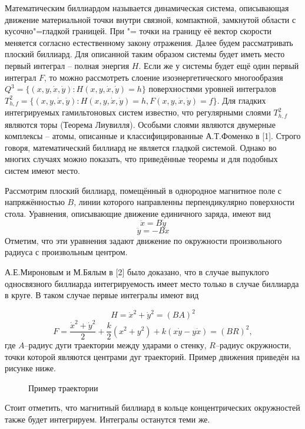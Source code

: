 \vzmscaption

	Математическим биллиардом называется динамическая система, описывающая движение материальной точки внутри связной, компактной, замкнутой области с кусочно"=гладкой границей. При "= точки на границу её вектор скорости меняется согласно естественному закону отражения. Далее будем рассматривать плоский биллиард. Для описанной таким образом системы будет иметь место первый интеграл -- полная энергия $H$. Если же у системы будет ещё один первый интеграл $F$, то можно рассмотреть слоение изоэнергетического многообразия $Q^3=\{(x,y,\dot{x}, \dot{y}): H(x,y,\dot{x}, \dot{y})=h\}$ поверхностями уровней интегралов $T^2_{h,f}=\{(x,y,\dot{x}, \dot{y}): H(x,y,\dot{x}, \dot{y})=h, F(x,y,\dot{x}, \dot{y})=f\}$. Для гладких интегрируемых гамильтоновых систем известно, что регулярными слоями $T^2_{h,f}$ являются торы (Теорема Лиувилля). Особыми слоями являются двумерные комплексы -- атомы, описанные и классифицированные А.Т.Фоменко в [1]. Строго говоря, математический биллиард не является гладкой системой. Однако во многих случаях можно показать, что приведённые теоремы и для подобных систем имеют место.

	Рассмотрим плоский биллиард, помещённый в однородное магнитное поле с напряжённостью $B$, линии которого направленны перпендикулярно поверхности стола. Уравнения, описывающие движение единичного заряда, имеют вид
	$$
	\ddot{x} =B\dot{y}
	$$
	$$
	\ddot{y} =-B\dot{x}
	$$
	Отметим, что эти уравнения задают движение по окружности произвольного радиуса с произвольным центром.

	А.Е.Мироновым и М.Бялым в [2] было доказано, что в случае выпуклого односвязного биллиарда интегрируемость имеет место только в случае биллиарда в круге. В таком случае первые интегралы имеют вид

	$$
	H=\dot{x}^2+\dot{y}^2=(BA)^2
	$$
	$$
	F=\frac{\dot{x}^2+\dot{y}^2}{2}+\frac{k}{2}(x^2+y^2)+k(x\dot{y}-y\dot{x})=(BR)^2,
	$$
	где $A$--радиус дуги траектории между ударами о стенку, $R$--радиус окружности, точки которой являются центрами дуг траекторий. Пример движения приведён на рисунке ниже.

	\begin{figure}[h!]
		\center{\texttt{[image: ex2]}}
		\caption{Пример траектории}
	\end{figure}
	Стоит отметить, что магнитный биллиард в кольце концентрических окружностей также будет интегрируем. Интегралы останутся теми же.

